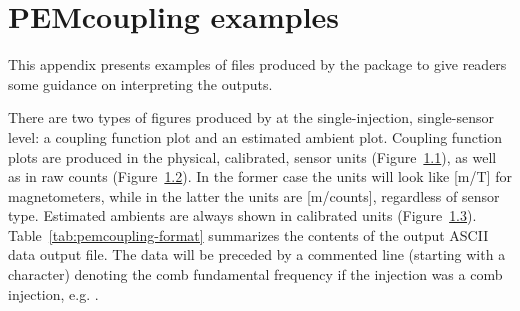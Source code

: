 \appendix

\renewcommand\thefigure{\thechapter.\arabic{figure}}
\renewcommand\thetable{\thechapter.\arabic{table}}
\setcounter{figure}{0}
\setcounter{table}{0}

\chapter{PEMcoupling examples}\label{app:pemcoupling}

This appendix presents examples of files produced by the \pemcoupling package to give readers some guidance on interpreting the outputs.

There are two types of figures produced by \pemcoupling at the single-injection, single-sensor level: a coupling function plot and an estimated ambient plot.
Coupling function plots are produced in the physical, calibrated, sensor units (Figure~\ref{fig:pemcoupling-cf-physical}), as well as in raw counts (Figure~\ref{fig:pemcoupling-cf-raw}).
In the former case the units will look like [m/T] for magnetometers, while in the latter the units are [m/counts], regardless of sensor type.
Estimated ambients are always shown in calibrated units (Figure~\ref{fig:pemcoupling-cf-ambient}).
Table~\ref{tab:pemcoupling-format} summarizes the contents of the output ASCII data output file.
The data will be preceded by a commented line (starting with a \code{\#} character) denoting the comb fundamental frequency if the injection was a comb injection, e.g. .

\begin{figure}
  \centering
  \caption{}
  \label{fig:pemcoupling-cf-physical}
\end{figure}

\begin{figure}
  \centering
  \caption{}
  \label{fig:pemcoupling-cf-raw}
\end{figure}

\begin{figure}
  \centering
  \caption{}
  \label{fig:pemcoupling-cf-ambient}
\end{figure}

